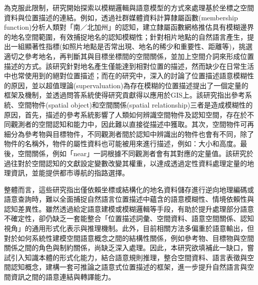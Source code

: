 為克服此限制，研究開始探索以模糊邏輯與語意模型的方式來處理基於坐標之空間資料與位置描述的連結。例如，\citet{RN133}透過社群媒體資料計算隸屬函數(membership function)分析人類對「南／北加州」的認知，建立隸屬函數網格推估具有模糊邊界的地名空間範圍，有效捕捉地名的認知模糊性；\citet{RN164}針對相片地點的自然語言產生，提出一組顯著性指標(如照片地點是否常出現、地名的稀少和重要性、距離等)，挑選適切之參考地名，再判斷其與目標坐標間的空間關係，並加上空間介詞來形成位置描述的方式。該研究針對地名產生僅能達到相對位置的描述，然而缺少在日常生活中也常使用到的絕對位置描述；而在\citet{RN128}的研究中，深入的討論了位置描述語意模糊性的原因，並以超值理論(supervaluation)為存在模糊的位置描述提出了一個定量的框架及機制，並透過問答系統使得研究貢獻得以應用於GIS上。該研究指出參考系統、空間物件(spatial object)和空間關係(spatial relationship)三者是造成模糊性的原因，首先，描述的參考系統影響了人類如何辨識空間物件及認知空間，存在於不同觀測者的空間認知和能力中，因此難以直接從描述中獲取。其次，空間物件可再細分為參考物與目標物件，不同觀測者間於認知中辨識出的物件也會有不同，除了物件的名稱外，物件的屬性資料也可能被用來進行描述，例如：大小和高度。最後，空間關係，例如「near」一詞根據不同觀測者會有其對應的定量值。該研究於過往對於空間認知的文獻設定變數改變其權重，以達成透過定性資料處理定量的地理資訊，並能提供都市導航的指路選擇。

整體而言，這些研究指出僅依賴坐標或結構化的地名資料儲存進行逆向地理編碼或語意查詢時，難以全面捕捉自然語言位置描述中蘊含的語意模糊性、情境依賴性與認知差異性。雖然透過給定語意建模或模糊邏輯等手段，有助於提升處理部分語意不確定性，卻仍缺乏一套能整合「位置描述詞彙、空間資料、語意空間關係、認知視角」的通用形式化表示與推理機制。此外，目前相關方法多偏重於語意輸出，但對於如何系統性建模空間語意概念之間的結構性關係，例如參考物、目標物與空間關係之間的角色與制約關係，尚缺乏深入處理。因此，本研究欲填補此一缺口，嘗試引入知識本體的形式化能力，結合語意規則推理，整合空間資料、語言表徵與空間認知概念，建構一套可推論之語意式位置描述的框架，進一步提升自然語言與空間資訊之間的語意連結與轉譯能力。

